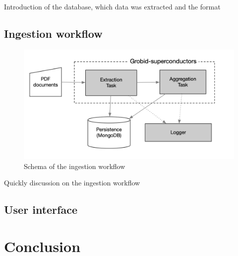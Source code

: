 \documentclass{article}
\begin{document}
Introduction of the database, which data was extracted and the format 

\subsection{Ingestion workflow}

\begin{figure}[ht]
\includegraphics[width=\textwidth]{workflow-schema-1}
\caption{Schema of the ingestion workflow}
\end{figure}


Quickly discussion on the ingestion workflow 


\subsection{User interface}


\section{Conclusion}



\end{document}
